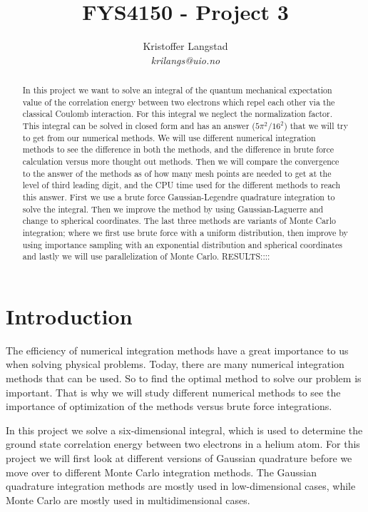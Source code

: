 \documentclass[12pt,a4paper,english]{article}
\title{FYS4150 - Project 3}
\date{}
\author{ Kristoffer Langstad\\ \textit{krilangs@uio.no}}
\begin{document}
\maketitle
\begin{abstract}
In this project we want to solve an integral of the quantum mechanical expectation value of the correlation energy between two electrons which repel each other via the classical Coulomb interaction. For this integral we neglect the normalization factor. This integral can be solved in closed form and has an answer ($5\pi^2/16^2$) that we will try to get from our numerical methods. We will use different numerical integration methods to see the difference in both the methods, and the difference in brute force calculation versus more thought out methods. Then we will compare the convergence to the answer of the methods as of how many mesh points are needed to get at the level of third leading digit, and the CPU time used for the different methods to reach this answer. First we use a brute force Gaussian-Legendre quadrature integration to solve the integral. Then we improve the method by using Gaussian-Laguerre and change to spherical coordinates. The last three methods are variants of Monte Carlo integration; where we first use brute force with a uniform distribution, then improve by using importance sampling with an exponential distribution and spherical coordinates and lastly we will use parallelization of Monte Carlo. RESULTS::::
\end{abstract}

\section{Introduction}
The efficiency of numerical integration methods have a great importance to us when solving physical problems. Today, there are many numerical integration methods that can be used. So to find the optimal method to solve our problem is important. That is why we will study different numerical methods to see the importance of optimization of the methods versus brute force integrations.

In this project we solve a six-dimensional integral, which is used to determine the ground state correlation energy between two electrons in a helium atom. For this project we will first look at different versions of Gaussian quadrature before we move over to different Monte Carlo integration methods. The Gaussian quadrature integration methods are mostly used in low-dimensional cases, while Monte Carlo are mostly used in multidimensional cases.
\end{document}
